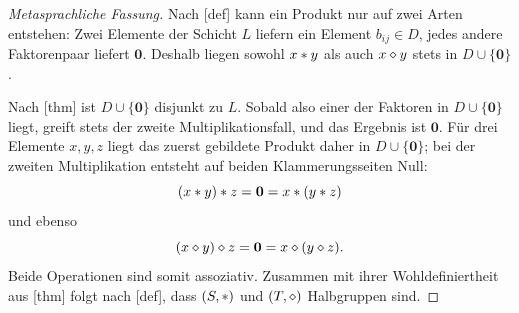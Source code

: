 \documentclass[main.tex]{subfiles}
\begin{document}
\begin{proof}[Metasprachliche Fassung]
Nach [def] kann ein Produkt nur auf
zwei Arten entstehen: Zwei Elemente der Schicht \(L\) liefern ein Element
\(b_{ij}\in D\), jedes andere Faktorenpaar liefert \(\mathbf0\). Deshalb
liegen sowohl \(x\mathbin{\ast} y\) als auch \(x\mathbin{\diamond} y\) stets in
\(D\cup\{\mathbf0\}\).

Nach [thm] ist
\(D\cup\{\mathbf0\}\) disjunkt zu \(L\). Sobald also einer der Faktoren
in \(D\cup\{\mathbf0\}\) liegt, greift stets der zweite
Multiplikationsfall, und das Ergebnis ist \(\mathbf0\). Für drei Elemente
\(x,y,z\) liegt das zuerst gebildete Produkt daher in
\(D\cup\{\mathbf0\}\); bei der zweiten Multiplikation entsteht auf beiden
Klammerungsseiten Null:
\[
  (x\mathbin{\ast} y)\mathbin{\ast} z=\mathbf0
    =x\mathbin{\ast}(y\mathbin{\ast} z)
\]
und ebenso
\[
  (x\mathbin{\diamond} y)\mathbin{\diamond} z=\mathbf0
    =x\mathbin{\diamond}(y\mathbin{\diamond} z).
\]
Beide Operationen sind somit assoziativ. Zusammen mit ihrer
Wohldefiniertheit aus
[thm] folgt nach
[def], dass \((S,\mathbin{\ast})\) und
\((T,\mathbin{\diamond})\) Halbgruppen sind.
\end{proof}
\end{document}
